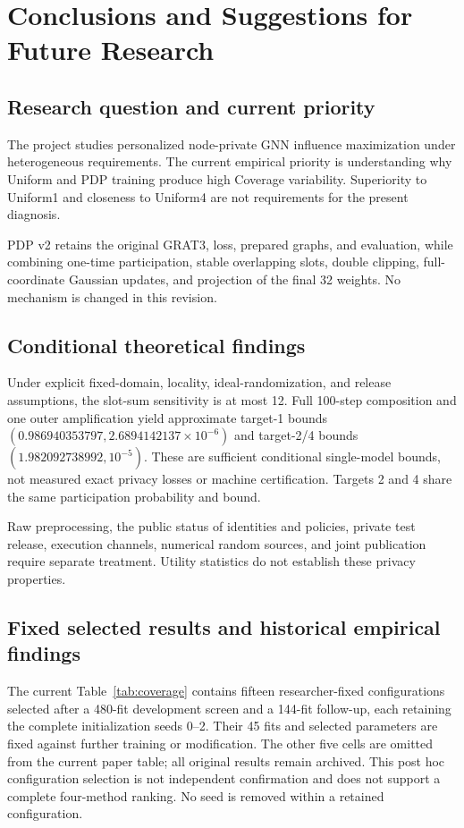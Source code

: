 \chapter{Conclusions and Suggestions for Future Research}\label{ch:conclusion}
\section{Research question and current priority}
The project studies personalized node-private GNN influence maximization under heterogeneous requirements. The current empirical priority is understanding why Uniform and PDP training produce high Coverage variability. Superiority to Uniform1 and closeness to Uniform4 are not requirements for the present diagnosis.

PDP v2 retains the original GRAT3, loss, prepared graphs, and evaluation, while combining one-time participation, stable overlapping slots, double clipping, full-coordinate Gaussian updates, and projection of the final 32 weights. No mechanism is changed in this revision.

\section{Conditional theoretical findings}
Under explicit fixed-domain, locality, ideal-randomization, and release assumptions, the slot-sum sensitivity is at most 12. Full 100-step composition and one outer amplification yield approximate target-1 bounds $(0.986940353797,2.6894142137\times10^{-6})$ and target-2/4 bounds $(1.982092738992,10^{-5})$. These are sufficient conditional single-model bounds, not measured exact privacy losses or machine certification. Targets 2 and 4 share the same participation probability and bound.

Raw preprocessing, the public status of identities and policies, private test release, execution channels, numerical random sources, and joint publication require separate treatment. Utility statistics do not establish these privacy properties.

\section{Fixed selected results and historical empirical findings}
The current Table~\ref{tab:coverage} contains fifteen researcher-fixed configurations selected after a 480-fit development screen and a 144-fit follow-up, each retaining the complete initialization seeds 0--2. Their 45 fits and selected parameters are fixed against further training or modification. The other five cells are omitted from the current paper table; all original results remain archived. This post hoc configuration selection is not independent confirmation and does not support a complete four-method ranking. No seed is removed within a retained configuration.

